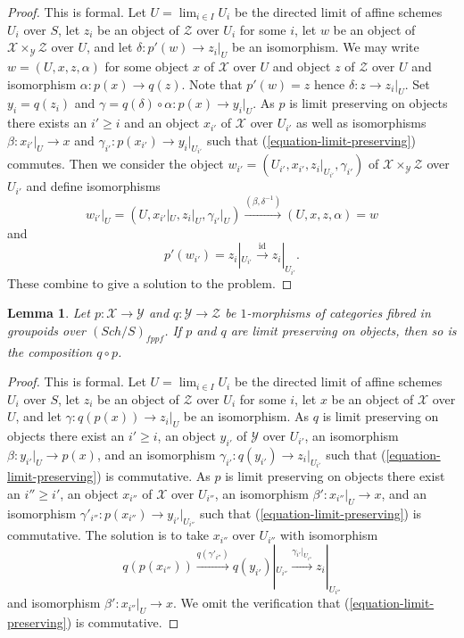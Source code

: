 \documentclass{stacks-project}
\theoremstyle{plain}
\newtheorem{lemma}[subsection]{Lemma}
\theoremstyle{definition}
\theoremstyle{remark}
\numberwithin{equation}{subsection}
\def\lim{\mathop{\mathrm{lim}}\nolimits}
\def\Sch{\mathit{Sch}}
\begin{document}
\begin{proof}
This is formal. Let $U = \lim_{i \in I} U_i$ be the directed limit
of affine schemes $U_i$ over $S$, let $z_i$ be an object of $\mathcal{Z}$
over $U_i$ for some $i$, let $w$ be an object of
$\mathcal{X} \times_\mathcal{Y} \mathcal{Z}$ over $U$, and let
$\delta : p'(w) \to z_i|_U$ be an isomorphism.
We may write
$w = (U, x, z, \alpha)$ for some object $x$ of $\mathcal{X}$ over $U$
and object $z$ of $\mathcal{Z}$ over $U$ and isomorphism
$\alpha : p(x) \to q(z)$. Note that $p'(w) = z$ hence
$\delta : z \to z_i|_U$. Set $y_i = q(z_i)$ and
$\gamma = q(\delta) \circ \alpha : p(x) \to y_i|_U$.
As $p$ is limit preserving on objects there exists an $i' \geq i$
and an object $x_{i'}$ of $\mathcal{X}$ over $U_{i'}$ as well as
isomorphisms $\beta : x_{i'}|_U \to x$ and
$\gamma_{i'} : p(x_{i'}) \to y_i|_{U_{i'}}$ such that
(\ref{equation-limit-preserving}) commutes. Then we consider the object
$w_{i'} = (U_{i'}, x_{i'}, z_i|_{U_{i'}}, \gamma_{i'})$ of
$\mathcal{X} \times_\mathcal{Y} \mathcal{Z}$ over $U_{i'}$
and define isomorphisms
$$
w_{i'}|_U = (U, x_{i'}|_U, z_i|_U, \gamma_{i'}|_U)
\xrightarrow{(\beta, \delta^{-1})}
(U, x, z, \alpha) = w
$$
and
$$
p'(w_{i'}) = z_i|_{U_{i'}} \xrightarrow{\text{id}} z_i|_{U_{i'}}.
$$
These combine to give a solution to the problem.
\end{proof}

\begin{lemma}
\label{lemma-composition-limit-preserving}
Let $p : \mathcal{X} \to \mathcal{Y}$ and $q : \mathcal{Y} \to \mathcal{Z}$
be $1$-morphisms of categories fibred in groupoids over $(\Sch/S)_{fppf}$.
If $p$ and $q$ are limit preserving on objects, then so is the composition
$q \circ p$.
\end{lemma}

\begin{proof}
This is formal. Let $U = \lim_{i \in I} U_i$ be the directed limit
of affine schemes $U_i$ over $S$, let $z_i$ be an object of $\mathcal{Z}$
over $U_i$ for some $i$, let $x$ be an object of $\mathcal{X}$ over $U$,
and let $\gamma : q(p(x)) \to z_i|_U$ be an isomorphism. As $q$ is
limit preserving on objects there exist an $i' \geq i$, an object
$y_{i'}$ of $\mathcal{Y}$ over $U_{i'}$, an isomorphism
$\beta : y_{i'}|_U \to p(x)$, and an isomorphism
$\gamma_{i'} : q(y_{i'}) \to z_i|_{U_{i'}}$
such that (\ref{equation-limit-preserving}) is commutative. As $p$ is
limit preserving on objects there exist an $i'' \geq i'$, an object
$x_{i''}$ of $\mathcal{X}$ over $U_{i''}$, an isomorphism
$\beta' : x_{i''}|_U \to x$, and an isomorphism
$\gamma'_{i''} : p(x_{i''}) \to y_{i'}|_{U_{i''}}$
such that (\ref{equation-limit-preserving}) is commutative.
The solution is to take $x_{i''}$ over $U_{i''}$ with isomorphism
$$
q(p(x_{i''})) \xrightarrow{q(\gamma'_{i''})}
q(y_{i'})|_{U_{i''}} \xrightarrow{\gamma_{i'}|_{U_{i''}}}
z_i|_{U_{i''}}
$$
and isomorphism $\beta' : x_{i''}|_U \to x$. We omit the verification
that (\ref{equation-limit-preserving}) is commutative.
\end{proof}
\end{document}
